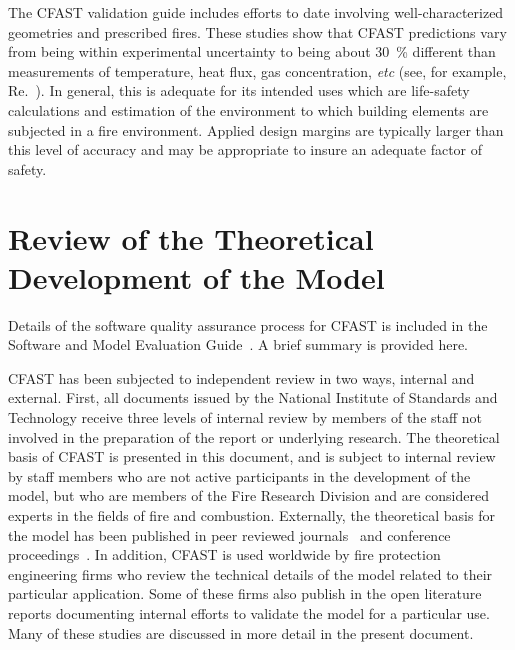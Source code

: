 The CFAST validation guide \cite{CFAST_Valid_Guide_6} includes efforts to date involving well-characterized geometries and prescribed fires. These studies show that  CFAST predictions vary from being within experimental   uncertainty  to  being   about  30~\%   different  than measurements of temperature, heat flux, gas concentration, {\em etc} (see, for example, Re.~\cite{NRCNUREG1824}). In general, this is adequate for its intended uses which are life-safety calculations and estimation of the environment to which building elements are subjected in a fire environment. Applied design margins are typically larger than this level of accuracy and may be
appropriate to insure an adequate factor of safety.


\section{Review of the Theoretical Development of the Model}

Details of the software quality assurance process for CFAST is included in the Software and Model Evaluation Guide~\cite{CFAST_Valid_Guide_6}. A brief summary is provided here.

CFAST has been subjected to independent review in two ways, internal and external. First, all documents issued by the National Institute of Standards and Technology receive three levels of internal review by members of the staff not involved in the preparation of the report or underlying research. The theoretical basis of CFAST is presented in this document, and is subject to internal review by staff members who are not active participants in the development of the model, but who are members of the Fire Research Division and are considered experts in the fields of fire and combustion. Externally, the theoretical basis for the model has been published in peer reviewed journals~\cite{Jones:1993a, Jones:1985, Jones:1984} and conference proceedings~\cite{Jones:1991}. In addition, CFAST is used worldwide by fire protection engineering firms who review the technical details of the model related to their particular application. Some of these firms also publish in the open literature reports documenting internal efforts to validate the model for a particular use. Many of these studies are discussed in more detail in the present document.

